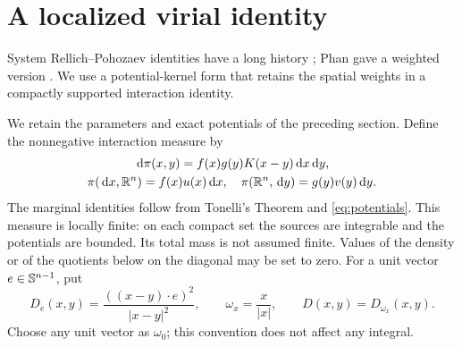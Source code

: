 \section{A localized virial identity}
\label{sec:localization}

System Rellich--Pohozaev identities have a long history
\cite{Mitidieri1993,Souplet2009}; Phan gave a weighted version
\cite{Phan}. We use a potential-kernel form that retains the spatial
weights in a compactly supported interaction identity.

We retain the parameters and exact potentials of the preceding section.
Define the nonnegative interaction measure by
\begin{equation}\label{eq:interaction}
\begin{gathered}
  \,\mathrm d\pi(x,y)=f(x)g(y)K(x-y)\,\mathrm d x\,\mathrm d y,\\
  \pi(\,\mathrm d x,\mathbb R^n)=f(x)u(x)\,\mathrm d x,
  \quad
  \pi(\mathbb R^n,\,\mathrm d y)=g(y)v(y)\,\mathrm d y.
\end{gathered}
\end{equation}
The marginal identities follow from Tonelli's Theorem and
\eqref{eq:potentials}. This measure is locally finite: on each compact
set the sources are integrable and the potentials are bounded.
Its total mass is not assumed finite. Values of the density or of the
quotients below on the diagonal may be set to zero.
For a unit vector \(e\in\mathbb S^{n-1}\), put
\[
  D_e(x,y)=\frac{((x-y)\cdot e)^2}{|x-y|^2},
  \qquad \omega_x=\frac{x}{|x|},
  \qquad D(x,y)=D_{\omega_x}(x,y).
\]
Choose any unit vector as \(\omega_0\); this convention does not affect
any integral.

